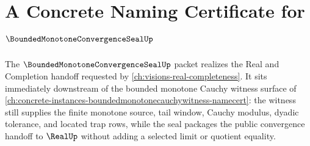\chapter{A Concrete Naming Certificate for $\BoundedMonotoneConvergenceSealUp$}
\label{ch:concrete-instances-bounded-monotone-convergence-seal-namecert}

The $\BoundedMonotoneConvergenceSealUp$ packet realizes the Real and Completion handoff requested by \autoref{ch:visions-real-completeness}. It sits immediately downstream of the bounded monotone Cauchy witness surface of \autoref{ch:concrete-instances-boundedmonotonecauchywitness-namecert}: the witness still supplies the finite monotone source, tail window, Cauchy modulus, dyadic tolerance, and located trap rows, while the seal packages the public convergence handoff to $\RealUp$ without adding a selected limit or quotient equality.

